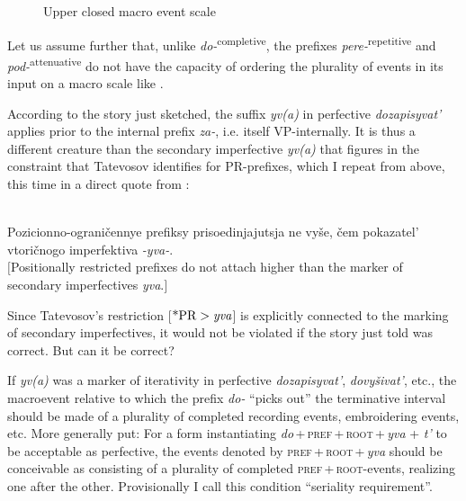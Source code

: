 \documentclass[output=paper,
colorlinks,
citecolor=brown,
newtxmath
]{langscibook}
\begin{document}
\begin{figure}
\caption{Upper closed macro event scale}
\label{fig:macroscale}
\end{figure}

Let us assume further that, unlike \textit{do-}\textsuperscript{completive}, the prefixes \textit{pere-}\textsuperscript{repetitive} and \textit{pod-}\textsuperscript{attenuative} do not have the capacity of ordering the plurality of events in its input on a macro scale like .

According to the story just sketched, the suffix \textit{yv(a)} in perfective \textit{dozapisyvat'} applies prior to the internal prefix \textit{za-}, i.e. itself VP-internally. It is thus a different creature than the secondary imperfective \textit{yv(a)} that figures in the constraint that Tatevosov identifies for PR-prefixes, which I repeat from above, this time in a direct quote from \citet[4]{Tatevosov2013b}:


\\Pozicionno-ograničennye prefiksy prisoedinjajutsja ne vyše, čem pokazatel' vtoričnogo imperfektiva \textit{-yva-}.\smallskip\\
$[$Positionally restricted prefixes do not attach higher than the marker of secondary imperfectives \textit{yva}.$]$
\z

\noindent Since Tatevosov's restriction [$\text{*PR}>\text{\textit{yva}}$] is explicitly connected to the marking of secondary imperfectives, it would not be violated if the story just told was correct. But can it be correct?

If \textit{yv(a)} was a marker of iterativity in perfective \textit{dozapisyvat'}, \textit{dovyšivat'}, etc., the macroevent relative to which the prefix \textit{do-} ``picks out'' the terminative interval should be made of a plurality of completed recording events, embroidering events, etc. More generally put: For a form instantiating \textit{do}\,+\,\textsc{pref}\,+\,\textsc{root}\,+\,\textit{yva} + \textit{t'} to be acceptable as perfective, the events denoted by \textsc{pref}\,+\,\textsc{root}\,+\,\textit{yva} should be conceivable as consisting of a plurality of completed  \textsc{pref}\,+\,\textsc{root}-events, realizing one after the other. Provisionally I call this condition ``seriality requirement''.
\end{document}
